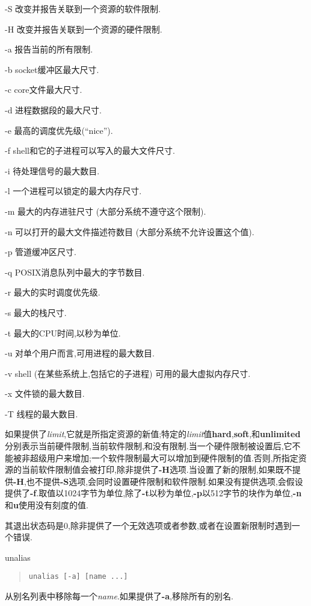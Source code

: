 \documentclass[draft,openany]{book}
\begin{document}
\begin{CJK}{UTF8}{gbsn}
\begin{basedescript}{\desclabelstyle{\nextlinelabel}\desclabelwidth{2.5em}}
        \begin{basedescript}{\desclabelstyle{\nextlinelabel}\desclabelwidth{2.5em}}
        \item[-S] 改变并报告关联到一个资源的软件限制.
        \item[-H] 改变并报告关联到一个资源的硬件限制.
        \item[-a] 报告当前的所有限制.
        \item[-b] socket缓冲区最大尺寸.
        \item[-c] core文件最大尺寸.
        \item[-d] 进程数据段的最大尺寸.
        \item[-e] 最高的调度优先级(``nice'').
        \item[-f] shell和它的子进程可以写入的最大文件尺寸.
        \item[-i] 待处理信号的最大数目.
        \item[-l] 一个进程可以锁定的最大内存尺寸.
        \item[-m] 最大的内存进驻尺寸 (大部分系统不遵守这个限制).
        \item[-n] 可以打开的最大文件描述符数目 (大部分系统不允许设置这个值).
        \item[-p] 管道缓冲区尺寸.
        \item[-q] POSIX消息队列中最大的字节数目.
        \item[-r] 最大的实时调度优先级.
        \item[-s] 最大的栈尺寸.
        \item[-t] 最大的CPU时间,以秒为单位.
        \item[-u] 对单个用户而言,可用进程的最大数目.
        \item[-v] shell (在某些系统上,包括它的子进程) 可用的最大虚拟内存尺寸.
        \item[-x] 文件锁的最大数目.
        \item[-T] 线程的最大数目.
        \end{basedescript}
        如果提供了\emph{limit},它就是所指定资源的新值;特定的\emph{limit}值\textbf{hard},\textbf{soft},和\textbf{unlimited}分别表示当前硬件限制,当前软件限制,和没有限制.当一个硬件限制被设置后,它不能被非超级用户来增加;一个软件限制最大可以增加到硬件限制的值.否则,所指定资源的当前软件限制值会被打印,除非提供了\textbf{-H}选项.当设置了新的限制,如果既不提供\textbf{-H},也不提供\textbf{-S}选项,会同时设置硬件限制和软件限制.如果没有提供选项,会假设提供了\textbf{-f}.取值以1024字节为单位,除了\textbf{-t}以秒为单位,\textbf{-p}以512字节的块作为单位,\textbf{-n}和\textbf{u}使用没有刻度的值.\par
        其退出状态码是0,除非提供了一个无效选项或者参数,或者在设置新限制时遇到一个错误.
    \item[unalias]
        \begin{quote}
            \verb+unalias [-a] [name ...]+
        \end{quote}
        从别名列表中移除每一个\emph{name}.如果提供了\textbf{-a},移除所有的别名.
    \end{basedescript}


\end{CJK}
\end{document}
